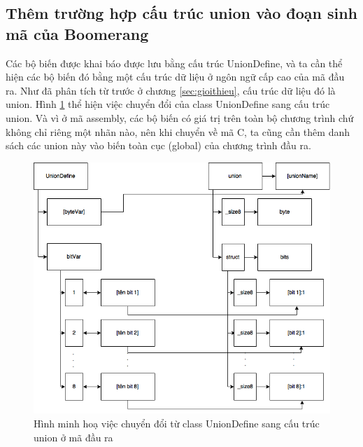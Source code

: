 \subsection{Thêm trường hợp cấu trúc union vào đoạn sinh mã của Boomerang}

Các bộ biến được khai báo được lưu bằng cấu trúc UnionDefine, và ta cần thể hiện các bộ biến đó bằng một cấu trúc dữ liệu ở ngôn ngữ cấp cao của mã đầu ra. Như đã phân tích từ trước ở chương \ref{sec:gioithieu}, cấu trúc dữ liệu đó là union. Hình \ref{fig:uniondefinemapping} thể hiện việc chuyển đổi của class UnionDefine sang cấu trúc union. Và vì ở mã assembly, các bộ biến có giá trị trên toàn bộ chương trình chứ không chỉ riêng một nhãn nào, nên khi chuyển về mã C, ta cũng cần thêm danh sách các union này vào biến toàn cục (global) của chương trình đầu ra.

\begin{figure}
\centering
\includegraphics[width=0.7\linewidth]{image/unionDefineMapping}
\caption{Hình minh hoạ việc chuyển đổi từ class UnionDefine sang cấu trúc union ở mã đầu ra}
\label{fig:uniondefinemapping}
\end{figure}

